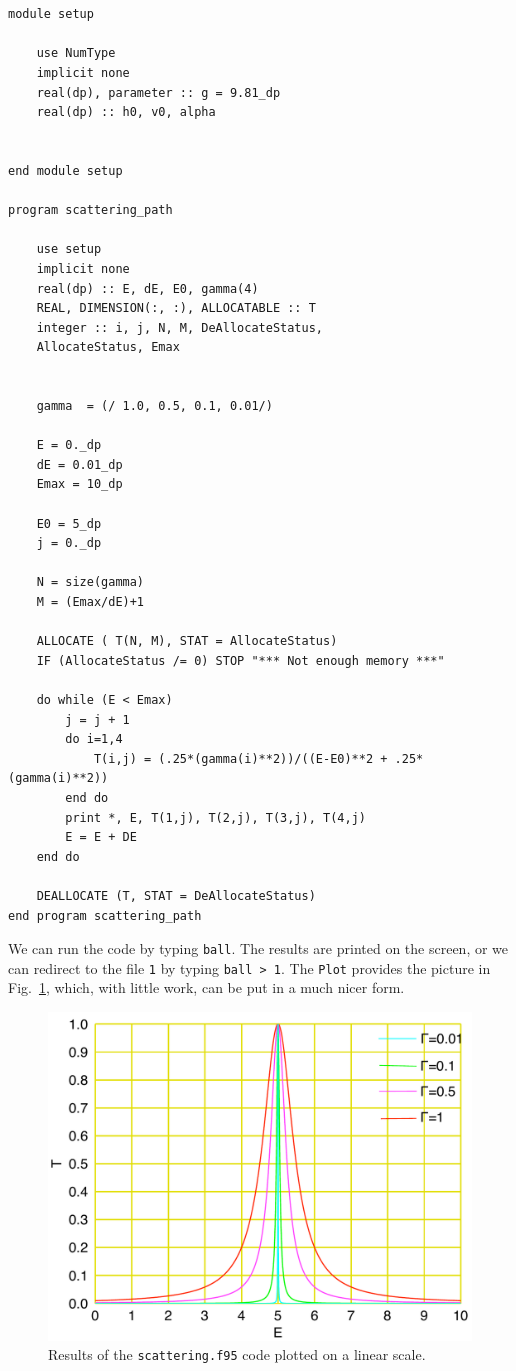 \documentclass[12pt]{article}
\begin{document}
\begin{lstlisting}[frame=single,caption={The {\tt scattering.f95}},label=scattering95]


module setup

	use NumType
	implicit none
	real(dp), parameter :: g = 9.81_dp
	real(dp) :: h0, v0, alpha
	

end module setup

program scattering_path

	use setup
	implicit none
	real(dp) :: E, dE, E0, gamma(4)
	REAL, DIMENSION(:, :), ALLOCATABLE :: T
	integer :: i, j, N, M, DeAllocateStatus,
	AllocateStatus, Emax


	gamma  = (/ 1.0, 0.5, 0.1, 0.01/) 

	E = 0._dp
	dE = 0.01_dp
	Emax = 10_dp

	E0 = 5_dp	
	j = 0._dp		

	N = size(gamma)
	M = (Emax/dE)+1

	ALLOCATE ( T(N, M), STAT = AllocateStatus)
	IF (AllocateStatus /= 0) STOP "*** Not enough memory ***"
		
	do while (E < Emax)
		j = j + 1
		do i=1,4
			T(i,j) = (.25*(gamma(i)**2))/((E-E0)**2 + .25*(gamma(i)**2))
		end do
		print *, E, T(1,j), T(2,j), T(3,j), T(4,j)
		E = E + DE
	end do 
		
	DEALLOCATE (T, STAT = DeAllocateStatus)
end program scattering_path

\end{lstlisting}


We can run the code by typing {\tt ball}. The results are printed on the screen, or we can redirect to the file {\tt 1} by typing {\tt ball > 1}. The {\tt Plot} provides the picture in Fig.\ \ref{linearscattering}, which, with little work, 
can be put in a much nicer form. 


\begin{figure}[htb]
\graphicspath{ {/plots/} }
\includegraphics[width=1.\textwidth]{linearplot.pdf}
\caption{Results of the {\tt scattering.f95} code plotted on a linear scale. }
\label{linearscattering}
\end{figure}
\end{document}
